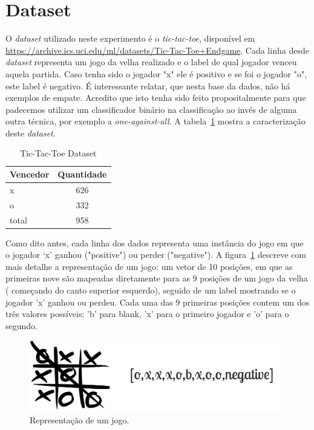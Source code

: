 \section{Dataset}\label{sec:dataset}

O \emph{dataset} utilizado neste experimento é o \emph{tic-tac-toe}, disponível em \url{https://archive.ics.uci.edu/ml/datasets/Tic-Tac-Toe+Endgame}. Cada linha desde \emph{dataset} representa um jogo da velha realizado e o label de qual jogador venceu aquela partida. Caso tenha sido o jogador "x" ele é positivo e se foi o jogador "o", este label é negativo. É interessante relatar, que nesta base da dados, não há exemplos de empate. Acredito que isto tenha sido feito propositalmente para que padecemos utilizar um classificador binário na classificação ao invés  de alguma outra técnica, por exemplo a \emph{one-against-all}. A tabela~\ref{tab:dataset} mostra a caracterização deste \emph{dataset}.

\begin{table}[h!]
\centering
\begin{tabular}{lc}
\textbf{Vencedor} & \textbf{Quantidade} \\ \hline 
x        & 626       \\
o        & 332       \\
total    & 958       \\
\end{tabular}
\caption{Tic-Tac-Toe Dataset}
\label{tab:dataset}
\end{table} 


Como dito antes, cada linha dos dados representa uma instância do jogo em que o jogador `x' ganhou ("positive") ou perder ("negative"). A figura~\ref{fig:representation} descreve com mais detalhe a representação de um jogo: um vetor de 10 posições, em que as primeiras nove são mapeadas diretamente para as 9 posições de um jogo da velha ( começando do canto superior esquerdo), seguido de um label mostrando se o jogador 'x' ganhou ou perdeu. Cada uma das 9 primeiras posições contem um dos três valores possíveis: 'b' para blank, 'x' para o primeiro jogador e 'o' para o segundo.   

\begin{figure}[h]
  \includegraphics[width=\linewidth]{imgs/game_representation.png}
  \caption{Representação de um jogo.}
  \label{fig:representation}
\end{figure}
